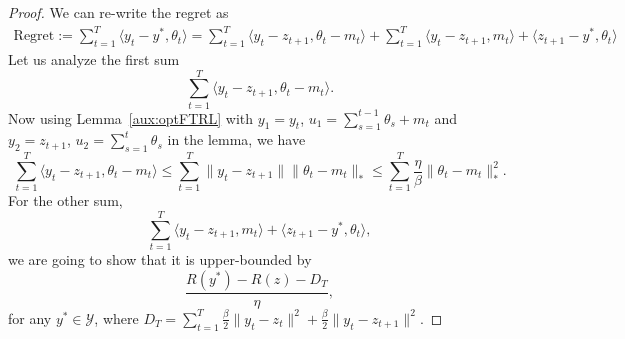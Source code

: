 \documentclass[pmlr]{jmlr} %
\newcommand{\YY}{\mathcal{Y}}
\begin{document}
\begin{proof}
We can re-write the regret as
\begin{equation}
\begin{aligned}
\text{Regret}:= \sum_{t=1}^{T} \langle y_{t} - y^{*}, \theta_{t} \rangle
= \sum_{t=1}^{T} \langle y_{t} - z_{t+1} , \theta_{t} - m_{t} \rangle + 
 \sum_{t=1}^{T}  \langle y_{t} - z_{t+1} , m_{t} \rangle + \langle z_{t+1} - y^{*}, \theta_{t} \rangle 
\end{aligned}
\end{equation}
Let us analyze the first sum
\begin{equation}
\sum_{t=1}^{T} \langle y_{t} - z_{t+1} , \theta_{t} - m_{t} \rangle.
\end{equation}
Now using Lemma~\ref{aux:optFTRL}
with $y_{1}=y_{t}$, $u_{1}=\sum_{{s=1}}^{{t-1}} \theta_{s} + m_{t}$ and $y_{2}=z_{t+1}$, 
$u_{2}=\sum_{{s=1}}^{{t}} \theta_{s} $ in the lemma,
we have 
\begin{equation} \label{qq1}
\sum_{t=1}^{T} \langle y_{t} - z_{t+1} , \theta_{t} - m_{t} \rangle
\leq \sum_{t=1}^{T} \|  y_{t} - z_{t+1} \| \| \theta_{t} - m_{t}\|_{*} 
\leq 
\sum_{t=1}^{T} \frac{\eta}{\beta} \| \theta_{t} - m_{t} \|^{2}_{*}.
\end{equation}
For the other sum,
\begin{equation}
\sum_{t=1}^{T}  \langle y_{t} - z_{t+1} , m_{t} \rangle + \langle z_{t+1} - y^{*}, \theta_{t} \rangle,
\end{equation}
we are going to show that it is upper-bounded by
\begin{equation}
\frac{ R(y^{*}) - R(z) - D_{T} }{\eta}, 
\end{equation}
for any $y^{*} \in \YY$, where $D_{T} = \sum_{{t=1}}^{T} \frac{\beta}{2} \| y_{t} - z_{t} \|^{2} 
+ \frac{\beta}{2} \| y_{t} - z_{t+1} \|^{2}$.




\end{proof}
\end{document}
